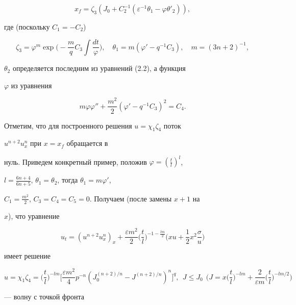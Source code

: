 $$ 


x_f=\zeta_3(J_0+C^{-1}_2(\varepsilon^{-1}\theta_1- 


\varphi\theta'_2)), 


$$ 


где (поскольку $C_1=-C_2$) 


$$ 


\zeta_3=\varphi^m\exp\bigg(-\frac{m}{q}C_3\int\frac{dt}{\varphi} 


\bigg),\quad \theta_1=m(\varphi'-q^{-1}C_3),\quad m=(3n+2)^{-1}, 


$$ 


$\theta_2$ определяется последним из уравнений (2.2), а функция 


$\varphi$ из уравнения 


$$ 


m\varphi\varphi''+\frac{m^2}{2}(\varphi'-q^{-1}C_3)^2=C_4. 


$$ 


Отметим, что для построенного решения $u=\chi_1\zeta_4$ поток 


$u^{n+2}u^n_x$ при $x=x_f$ обращается в 


нуль. Приведем конкретный пример, положив $\varphi=(\frac{t}{l})^l$, 


$l=\frac{6n+4}{6n+5}$, $\theta_1=\theta_2$, тогда $\theta_1=m\varphi'$, 


$C_1=\frac{m^2}{2}$, $C_3=C_4=C_5=0$. Получаем (после замены $x+1$ на 


$x$), что уравнение 


$$ 


u_t=(u^{n+2}u^n_x)_x+\frac{\varepsilon m^2}{2}\bigg(\frac{t}{l} 


\bigg)^{-1-\frac{l m}{2}}\bigg(x u+\frac{1}{2} 


x^2\frac{\sigma}{u}\bigg) 


$$ 


имеет решение 


$$ 


u=\chi_1\zeta_4=\bigg(\frac{t}{l}\bigg)^{-lm}\bigg[ 


\frac{\varepsilon m^2}{4}p^{-n}(J^{(n+2)/n}_0- 


J^{(n+2)/n})^n\bigg]^q,\ \ J\le J_0 \ \ 


\bigg(J=x\bigg(\frac{t}{l}\bigg)^{-lm}+\frac{2}{\varepsilon m} 


\bigg(\frac{t}{l}\bigg)^{-lm/2} \bigg)


$$ 


--- волну с точкой фронта 


